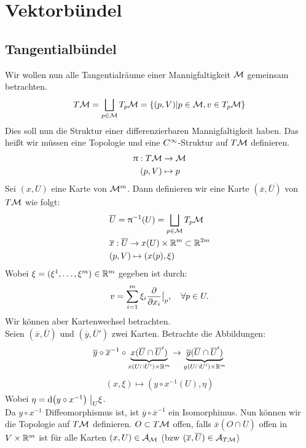 \chapter{Vektorbündel}
\section{Tangentialbündel}
Wir wollen nun alle Tangentialräume einer Mannigfaltigkeit $\mathcal{M}$ gemeinsam betrachten.
\begin{align}
T\mathcal{M} = \bigsqcup_{p\in \mathcal{M}} T_{p}\mathcal{M} = \{ (p, V) \vert p \in \mathcal{M}, v \in T_{p}\mathcal{M} \} 
\end{align}
Dies soll nun die Struktur einer differenzierbaren Mannigfaltigkeit haben. 
Das heißt wir müssen eine Topologie und eine $C^\infty$-Struktur auf $T\mathcal{M}$ definieren.
\begin{align}
\uppi: T\mathcal{M} &\to \mathcal{M} \\
(p,V) &\mapsto p
\end{align}
Sei $(x, U)$ eine Karte von $\mathcal{M}^m$. 
Dann definieren wir eine Karte $(\overline{x}, \overline{U})$ von $T\mathcal{M}$ wie folgt:
\begin{align}
&\overline{U} = \uppi^{-1}(U) = \bigsqcup_{p\in\mathcal{M}} T_{p}\mathcal{M} \\
&\overline{x}: \overline{U} \to x(U) \times \mathbb{R}^m \subset \mathbb{R}^{2m} \\
&(p, V) \mapsto (x(p), \xi)
\end{align}
Wobei $\xi = (\xi^1, \dots, \xi^m) \in \mathbb{R}^m$ gegeben ist durch:
\begin{align}
v = \sum_{i=1}^{m} \xi_i \pdv{x_i} \big\vert_p, \quad \forall p \in U.
\end{align}
Wir können aber Kartenwechsel betrachten.\\
Seien $(\overline{x}, \overline{U})$ und $(\overline{y}, \overline{U}')$ zwei Karten. 
Betrachte die Abbildungen:
\begin{align}
\overline{y} \circ \overline{x}^{-1} \circ \underbrace{x (\overline{U} \cap \overline{U}')}_{x(U \cap U') \times \mathbb{R}^m} \to \underbrace{\overline{y}(\overline{U} \cap \overline{U}')}_{y(U \cap U') \times \mathbb{R}^m}
\end{align}
\begin{align}
(x,\xi) \mapsto (y\circ x^{-1}(U), \eta) 
\end{align}
Wobei $\eta = \dd (y \circ x^{-1})\eval_U \xi$.\\
Da $y\circ x^{-1}$ Diffeomorphismus ist, ist $\overline{y} \circ \overline{x}^{-1}$ ein Isomorphimus.
Nun können wir die Topologie auf $T\mathcal{M}$ definieren.
$O \subset T\mathcal{M}$ offen, falls $\overline{x}(O\cap \overline{U})$ offen in $V \times \mathbb{R}^m$ ist für alle Karten $(x, U) \in \mathcal{A}_{\mathcal{M}}$ (bzw $(\overline{x}, \overline{U}) \in \mathcal{A}_{T\mathcal{M}}$)

